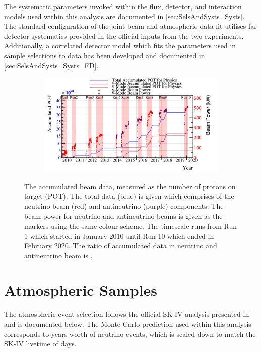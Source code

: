 The systematic parameters invoked within the flux, detector, and interaction models used within this analysis are documented in \autoref{sec:SelsAndSysts_Systs}. The standard configuration of the joint beam and atmospheric data fit utilises far detector systematics provided in the official inputs from the two experiments. Additionally, a correlated detector model which fits the parameters used in sample selections to data has been developed and documented in \autoref{sec:SelsAndSysts_Systs_FD}.

\begin{figure}[h]
  \begin{subfigure}[t]{\textwidth}
    \includegraphics[width=\textwidth, trim={0mm 0mm 0mm 0mm}, clip,page=1]{Figures/Selections/BeamPowerAndPOT.pdf}
  \end{subfigure}
  \caption{The accumulated beam data, measured as the number of protons on target (POT). The total data (blue) is given which comprises of the neutrino beam (red) and antineutrino (purple) components. The beam power for neutrino and antineutrino beams is given as the markers using the same colour scheme. The timescale runs from Run 1 which started in January 2010 until Run 10 which ended in February 2020. The ratio of accumulated data in neutrino and antineutrino beam is .}
  \label{fig:SelsAndSysts_Beam_PowerAndPOT}
\end{figure}

\newpage
\section{Atmospheric Samples}
\label{sec:SelsAndSysts_Sels_Atms}

The atmospheric event selection follows the official SK-IV analysis presented in \cite{Jiang2019-iw} and is documented below. The Monte Carlo prediction used within this analysis corresponds to  years worth of neutrino events, which is scaled down to match the SK-IV livetime of  days.

